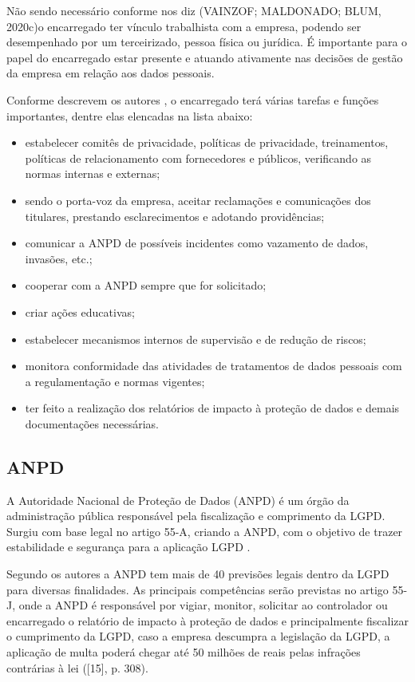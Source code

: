 \documentclass[
	12pt,				%
	openright,			%
	oneside,			%
	a4paper,			%
	english,			%
	french,				%
	spanish,			%
	brazil,				%
	]{abntex2}
\begin{document}
Não sendo necessário conforme nos diz (VAINZOF; MALDONADO; BLUM, 2020c)o encarregado ter vínculo trabalhista com a empresa, podendo ser desempenhado por um terceirizado, pessoa física ou jurídica.  É importante para o papel do encarregado estar presente e atuando ativamente nas decisões de gestão da empresa em relação aos dados pessoais.

Conforme descrevem os autores , o encarregado terá várias tarefas e funções importantes, dentre elas elencadas na lista abaixo:


\begin{itemize}
\item estabelecer comitês de privacidade, políticas de privacidade, treinamentos, políticas de relacionamento com fornecedores e públicos, verificando as normas internas e externas;
\item sendo o porta-voz da empresa, aceitar reclamações e comunicações dos titulares, prestando esclarecimentos e adotando providências;
\item comunicar a ANPD de possíveis incidentes como vazamento de dados, invasões, etc.; 
\item cooperar com a ANPD sempre que for solicitado;
\item criar ações educativas;
\item estabelecer mecanismos internos de supervisão e de redução de riscos;
\item monitora conformidade das atividades de tratamentos de dados pessoais com a regulamentação e normas vigentes;
\item ter feito a realização dos relatórios de impacto à proteção de dados e demais documentações necessárias.
\end{itemize}


\subsection{ANPD}

A Autoridade Nacional de Proteção de Dados (ANPD) é um órgão da administração pública responsável pela fiscalização e comprimento da LGPD. Surgiu com base legal no artigo 55-A, criando a ANPD, com o objetivo de trazer estabilidade e segurança para a aplicação LGPD \cite{Pinheiro2021}.

Segundo os autores  a ANPD tem mais de 40 previsões legais dentro da LGPD para diversas finalidades. As principais competências serão previstas no artigo 55-J, onde a ANPD é responsável por vigiar, monitor, solicitar ao controlador ou encarregado o relatório de impacto à proteção de dados e principalmente fiscalizar o cumprimento da LGPD, caso a empresa descumpra a legislação da LGPD, a aplicação de multa poderá chegar até 50 milhões de reais pelas infrações contrárias à lei      ([15], p. 308).  
\end{document}
